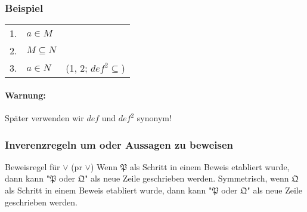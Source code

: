         \subsubsection*{Beispiel}
            \begin{tabular}{p{0.8cm}p{6cm}p{4cm}}
                1. & \(a \in M\) & \\
                2. & \(M \subseteq N\) & \\
                3. & \(a \in N\) & (1, 2; \(def^2 \subseteq\))\\
            \end{tabular}
            \paragraph{Warnung:}
                Später verwenden wir \(def\) und \(def^2\) synonym!
                \subsubsection{Inverenzregeln um oder Aussagen zu beweisen}
                {
                    Beweisregel für \(\vee\) (pr \(\vee\))
                }
                {
                    Wenn \(\mathfrak{P}\) als Schritt in einem Beweis etabliert wurde, dann kann "\(\mathfrak{P}\) oder \(\mathfrak{Q}\)" als neue Zeile geschrieben werden. Symmetrisch, wenn \(\mathfrak{Q}\) als Schritt in einem Beweis etabliert wurde, dann kann "\(\mathfrak{P}\) oder \(\mathfrak{Q}\)" als neue Zeile geschrieben werden.
                }
